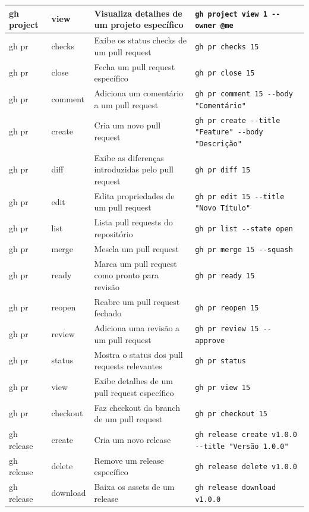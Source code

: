\begin{longtable}{|p{2cm}|p{2.3cm}|p{4cm}|p{6cm}|}
    \hline
    gh project & view & Visualiza detalhes de um projeto específico & \texttt{gh project view 1 -{-}owner @me} \\
    \hline
    gh pr & checks & Exibe os status checks de um pull request & \texttt{gh pr checks 15} \\
    \hline
    gh pr & close & Fecha um pull request específico & \texttt{gh pr close 15} \\
    \hline
    gh pr & comment & Adiciona um comentário a um pull request & \texttt{gh pr comment 15 -{-}body "Comentário"} \\
    \hline
    gh pr & create & Cria um novo pull request & \texttt{gh pr create -{-}title "Feature" -{-}body "Descrição"} \\
    \hline
    gh pr & diff & Exibe as diferenças introduzidas pelo pull request & \texttt{gh pr diff 15} \\
    \hline
    gh pr & edit & Edita propriedades de um pull request & \texttt{gh pr edit 15 -{-}title "Novo Título"} \\
    \hline
    gh pr & list & Lista pull requests do repositório & \texttt{gh pr list -{-}state open} \\
    \hline
    gh pr & merge & Mescla um pull request & \texttt{gh pr merge 15 -{-}squash} \\
    \hline
    gh pr & ready & Marca um pull request como pronto para revisão & \texttt{gh pr ready 15} \\
    \hline
    gh pr & reopen & Reabre um pull request fechado & \texttt{gh pr reopen 15} \\
    \hline
    gh pr & review & Adiciona uma revisão a um pull request & \texttt{gh pr review 15 -{-}approve} \\
    \hline
    gh pr & status & Mostra o status dos pull requests relevantes & \texttt{gh pr status} \\
    \hline
    gh pr & view & Exibe detalhes de um pull request específico & \texttt{gh pr view 15} \\
    \hline
    gh pr & checkout & Faz checkout da branch de um pull request & \texttt{gh pr checkout 15} \\
    \hline
    gh release & create & Cria um novo release & \texttt{gh release create v1.0.0 -{-}title "Versão 1.0.0"} \\
    \hline
    gh release & delete & Remove um release específico & \texttt{gh release delete v1.0.0} \\
    \hline
    gh release & download & Baixa os assets de um release & \texttt{gh release download v1.0.0} \\

\end{longtable}
